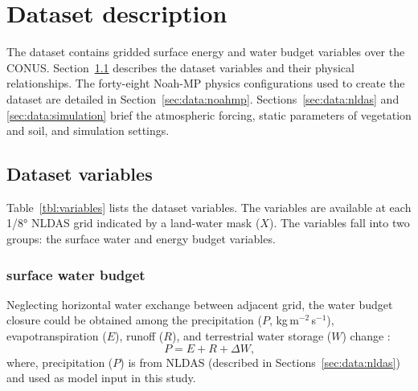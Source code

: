 \documentclass[essd]{copernicus}
\begin{document}
\section{Dataset description}\label{sec:data}

The dataset contains gridded surface energy and water budget variables over the
CONUS. Section~\ref{sec:data:variables} describes the dataset variables and
their physical relationships. The forty-eight Noah-MP physics configurations
used to create the dataset are detailed in Section~\ref{sec:data:noahmp}.
Sections~\ref{sec:data:nldas} and \ref{sec:data:simulation} brief the
atmospheric forcing, static parameters of vegetation and soil, and simulation
settings.


\subsection{Dataset variables}\label{sec:data:variables}

Table~\ref{tbl:variables} lists the dataset variables. The variables are
available at each 1/8° NLDAS grid indicated by a land-water mask
(\(X\)). The variables fall into two groups: the surface water and energy budget
variables.



\subsubsection{surface water budget}

Neglecting horizontal water exchange between adjacent grid, the water budget
closure could be obtained among the precipitation (\(P\),
kg\,m$^{-2}$\,s$^{-1}$), evapotranspiration (\(E\)), runoff (\(R\)), and
terrestrial water storage (\(W\)) change \citep{zheng2020JAMES}:
\begin{equation}
    P = E + R + \Delta W \text{,}
\end{equation}
where, precipitation (\(P\)) is from NLDAS (described in
Sections~\ref{sec:data:nldas}) and used as model input in this study.
\end{document}
